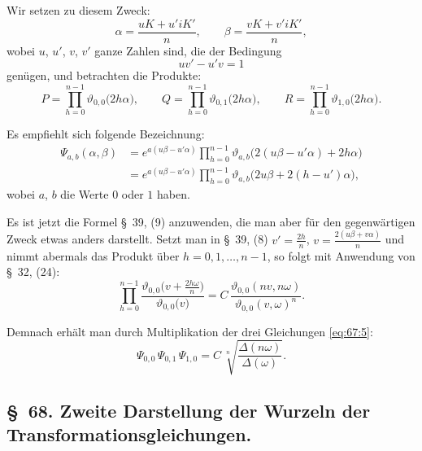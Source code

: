 \documentclass[11pt,a4paper]{article}
\theoremstyle{plain}
\theoremstyle{remark}
\begin{document}
Wir setzen zu diesem Zweck:
\begin{equation}\label{eq:67:1}
\alpha = \frac{uK+u'iK'}{n},\qquad
\beta = \frac{vK+v'iK'}{n},
\end{equation}
wobei $u$, $u'$, $v$, $v'$ ganze Zahlen sind, die der Bedingung
\begin{equation}\label{eq:67:2}
uv' - u'v = 1
\end{equation}
genügen, und betrachten die Produkte:
\begin{equation}\label{eq:67:3}
P = \prod_{h=0}^{n-1}
\vartheta_{0,0}\bigl(2h\alpha\bigr),\qquad
Q = \prod_{h=0}^{n-1}
\vartheta_{0,1}\bigl(2h\alpha\bigr),\qquad
R = \prod_{h=0}^{n-1}
\vartheta_{1,0}\bigl(2h\alpha\bigr).
\end{equation}

Es empfiehlt sich folgende Bezeichnung:
\begin{equation}\label{eq:67:4}
\begin{aligned}
\Psi_{a,b}(\alpha,\beta)
&= e^{a(u\beta-u'\alpha)} \prod_{h=0}^{n-1}
   \vartheta_{a,b}\bigl(2(u\beta-u'\alpha)+2h\alpha\bigr)\\
&= e^{a(u\beta-u'\alpha)} \prod_{h=0}^{n-1}
   \vartheta_{a,b}\bigl(2u\beta+2(h-u')\alpha\bigr),
\end{aligned}
\end{equation}
wobei $a$, $b$ die Werte $0$ oder $1$ haben.

Es ist jetzt die Formel §~39, (9) anzuwenden, die man aber für
den gegenwärtigen Zweck etwas anders darstellt. Setzt man in
§~39, (8) $v'=\frac{2h}{n}$, $v=\frac{2(u\beta+v\alpha)}{n}$ und
nimmt abermals das Produkt über $h=0,1,\dots,n-1$, so folgt
mit Anwendung von §~32, (24):
\begin{equation}\label{eq:67:5}
\prod_{h=0}^{n-1}
\frac{\vartheta_{0,0}\bigl(v+\frac{2h\omega}{n}\bigr)}
     {\vartheta_{0,0}\bigl(v\bigr)}
= C\,\frac{\vartheta_{0,0}(nv,n\omega)}
          {\vartheta_{0,0}(v,\omega)^n}.
\end{equation}

Demnach erhält man durch Multiplikation der drei Gleichungen
\eqref{eq:67:5}:
\begin{equation}\label{eq:67:6}
\Psi_{0,0}\,\Psi_{0,1}\,\Psi_{1,0}
= C\,\sqrt[n]{\frac{\Delta(n\omega)}{\Delta(\omega)}}.
\end{equation}


\subsection*{§~68. Zweite Darstellung der Wurzeln der Transformationsgleichungen.}
\end{document}
